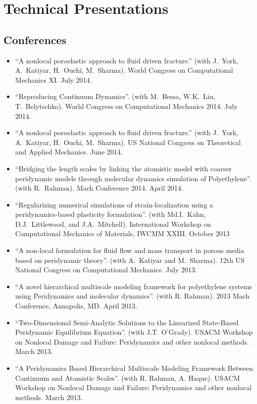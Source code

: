 \section*{Technical Presentations}

\subsection*{Conferences}

\begin{itemize}
    \item ``A nonlocal poroelastic approach to fluid driven fracture.'' (with J.~York, A.~Katiyar, H.~Ouchi, M.~Sharma). World Congress on Computational Mechanics XI.  July 2014.
    \item ``Reproducing Continuum Dynamics''. (with M.~Bessa, W.K.~Liu, T.~Belytschko). World Congress on Computational Mechanics 2014.  July 2014.
    \item ``A nonlocal poroelastic approach to fluid driven fracture.'' (with J.~York, A.~Katiyar, H.~Ouchi, M.~Sharma). US National Congress on Theoretical and Applied Mechanics.  June 2014.
    \item ``Bridging the length scales by linking the atomistic model with coarser peridynamic models through molecular dynamics simulation of Polyethylene''. (with R.~Rahman). Mach Conference 2014.  April 2014.
    \item ``Regularizing numerical simulations of strain-localization using a peridynamics-based plasticity formulation''. (with Md.I.~Kahn, D.J.~Littlewood, and J.A.~Mitchell). International Workshop on Computational Mechanics of Materials, IWCMM XXIII. October 2013
    \item ``A non-local formulation for fluid flow and mass transport in porous media based on peridynamic theory''. (with A.~Katiyar and M.~Sharma). 12th US National Congress on Computational Mechanics. July 2013.
    \item ``A novel hierarchical multiscale modeling framework for polyethylene systems using Peridynamics and molecular dynamics''. (with R. Rahman). 2013 Mach Conference, Annapolis, MD. April 2013. 
    \item ``Two-Dimensional Semi-Analytic Solutions to the Linearized State-Based Peridynamic Equilibrium Equation''. (with J.T. O'Grady). USACM Workshop on Nonlocal Damage and Failure: Peridynamics and other nonlocal methods. March 2013.
    \item ``A Peridynamics Based Hierarchical Multiscale Modeling Framework Between Continuum and Atomistic Scales''. (with R. Rahman, A. Haque). USACM Workshop on Nonlocal Damage and Failure: Peridynamics and other nonlocal methods. March 2013.

\end{itemize}
